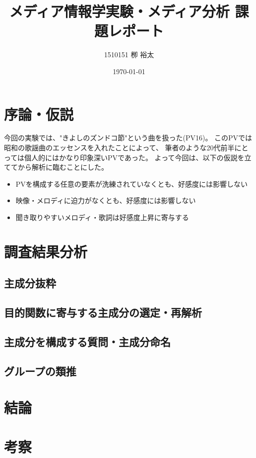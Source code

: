 \documentclass[11pt,a4paper, uplatex]{jsarticle}
\title{メディア情報学実験・メディア分析 課題レポート}
\author{1510151  栁 裕太}
\date{\today}
\begin{document}
\maketitle
\section{序論・仮説}
今回の実験では、"きよしのズンドコ節"という曲を扱った(PV16)。
このPVでは昭和の歌謡曲のエッセンスを入れたことによって、
筆者のような20代前半にとっては個人的にはかなり印象深いPVであった。
よって今回は、以下の仮説を立ててから解析に臨むことにした。

\begin{itemize}
  \item PVを構成する任意の要素が洗練されていなくとも、好感度には影響しない
  \item 映像・メロディに迫力がなくとも、好感度には影響しない
  \item 聞き取りやすいメロディ・歌詞は好感度上昇に寄与する
\end{itemize}

\section{調査結果分析}
\subsection{主成分抜粋}
\subsection{目的関数に寄与する主成分の選定・再解析}
\subsection{主成分を構成する質問・主成分命名}
\subsection{グループの類推}


\section{結論}
\section{考察}
\end{document}
